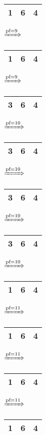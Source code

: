 \documentclass{article}
\begin{document}
\begin{itemize}
\begin{tabular}{|c|c|c|}
            \hline
            1 & 6 & 4\\
            \hline
        \end{tabular}
        $\xRightarrow{\text{pf}=9}$
        \begin{tabular}{|c|c|c|}
            \hline
            1 & 6 & 4\\
            \hline
        \end{tabular}
        $\xRightarrow{\text{pf}=9}$
        \begin{tabular}{|c|c|c|}
            \hline
            3 & 6 & 4\\
            \hline
        \end{tabular}
        $\xRightarrow{\text{pf}=10}$
        \begin{tabular}{|c|c|c|}
            \hline
            3 & 6 & 4\\
            \hline
        \end{tabular}
        $\xRightarrow{\text{pf}=10}$
        \begin{tabular}{|c|c|c|}
            \hline
            3 & 6 & 4\\
            \hline
        \end{tabular}
        $\xRightarrow{\text{pf}=10}$
        \begin{tabular}{|c|c|c|}
            \hline
            3 & 6 & 4\\
            \hline
        \end{tabular}
        $\xRightarrow{\text{pf}=10}$
        \begin{tabular}{|c|c|c|}
            \hline
            1 & 6 & 4\\
            \hline
        \end{tabular}
        $\xRightarrow{\text{pf}=11}$
        \begin{tabular}{|c|c|c|}
            \hline
            1 & 6 & 4\\
            \hline
        \end{tabular}
        $\xRightarrow{\text{pf}=11}$
        \begin{tabular}{|c|c|c|}
            \hline
            1 & 6 & 4\\
            \hline
        \end{tabular}
        $\xRightarrow{\text{pf}=11}$
        \begin{tabular}{|c|c|c|}
            \hline
            1 & 6 & 4\\
            \hline
        \end{tabular}

\end{itemize}
\end{document}

